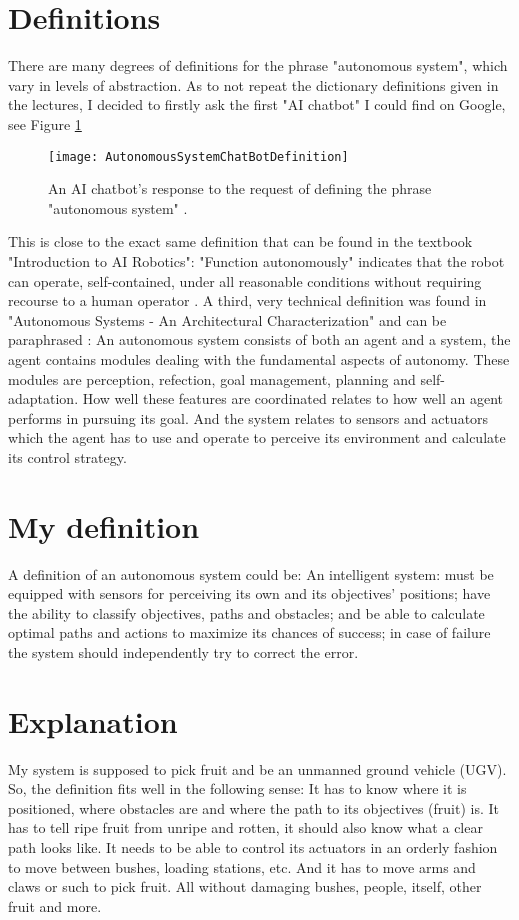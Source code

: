 \documentclass[%
oneside,    %
project,    %
nosummary   %
]{USN-MSc}
\begin{document}
\section{Definitions}
There are many degrees of definitions for the phrase "autonomous system", which vary in levels of abstraction. 
As to not repeat the dictionary definitions given in the lectures, I decided to firstly ask the first "AI chatbot" I could find on Google, see Figure \ref{fig:chat-bot}
\begin{figure}[!ht]
  \centering
  \texttt{[image: AutonomousSystemChatBotDefinition]}
  \caption{An AI chatbot's response to the request of defining the phrase "autonomous system" \cite{ChaiChat90:online}.}
  \label{fig:chat-bot}
\end{figure}
This is close to the exact same definition that can be found in the textbook "Introduction to AI Robotics":
"Function autonomously" indicates that the robot can operate, self-contained, under all reasonable conditions without requiring recourse to a human operator 
\cite{murphy2000introduction}.
A third, very technical definition was found in "Autonomous Systems - An Architectural Characterization" and can be paraphrased \cite{Sifakis}:
An autonomous system consists of both an agent and a system, the agent contains modules dealing with the fundamental aspects of autonomy.
These modules are perception, refection, goal management, planning and self-adaptation. How well these features are coordinated relates to how well an agent performs in pursuing its goal.
And the system relates to sensors and actuators which the agent has to use and operate to perceive its environment and calculate its control strategy.

\section{My definition}
\label{sec:myDefinition}
A definition of an autonomous system could be:
An intelligent system: must be equipped with sensors for perceiving its own and its objectives' positions; 
have the ability to classify objectives, paths and obstacles; 
and be able to calculate optimal paths and actions to maximize its chances of success;
in case of failure the system should independently try to correct the error.

\section{Explanation}
\label{sec:myExplanation}
My system is supposed to pick fruit and be an unmanned ground vehicle (UGV).
So, the definition fits well in the following sense:
It has to know where it is positioned, where obstacles are and where the path to its objectives (fruit) is.
It has to tell ripe fruit from unripe and rotten, it should also know what a clear path looks like.
It needs to be able to control its actuators in an orderly fashion to move between bushes, loading stations, etc. 
And it has to move arms and claws or such to pick fruit. All without damaging bushes, people, itself, other fruit and more.
\end{document}
